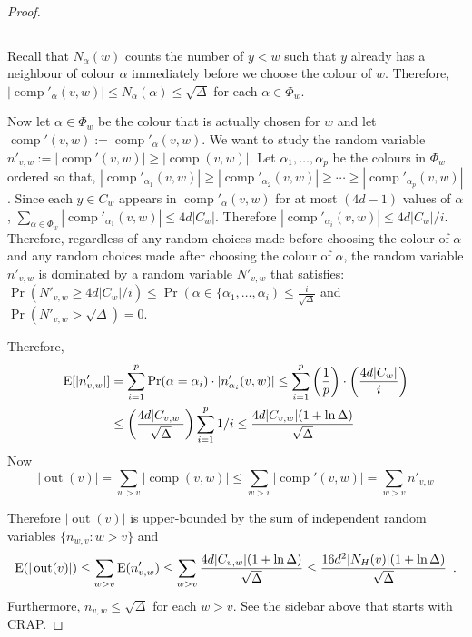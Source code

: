 \documentclass[kpfonts]{patmorin}
\DeclareMathOperator{\outn}{out}
\DeclareMathOperator{\comp}{comp}
\begin{document}
\begin{proof}
  \hrule






  Recall that $N_\alpha(w)$ counts the number of $y < w$ such that $y$ already has a neighbour of colour $\alpha$ immediately before we choose the colour of $w$.  Therefore,  $|\comp'_\alpha(v,w)|\le N_\alpha(\alpha)\le \sqrt{\Delta}$ for each $\alpha\in\Phi_w$.

  Now let $\alpha\in\Phi_w$ be the colour that is actually chosen for $w$ and let $\comp'(v,w):=\comp'_\alpha(v,w)$.  We want to study the random variable $n'_{v,w}:=|\comp'(v,w)|\ge |\comp(v,w)|$.  Let $\alpha_1,\ldots,\alpha_p$ be the colours in $\Phi_w$ ordered so that, $|\comp'_{\alpha_1}(v,w)|\ge|\comp'_{\alpha_2}(v,w)|\ge\cdots\ge |\comp'_{\alpha_p}(v,w)|$.  Since each $y\in C_w$ appears in
  $\comp'_{\alpha}(v,w)$ for at most $(4d-1)$ values of $\alpha$,  $\sum_{\alpha\in\Phi_w} |\comp'_{\alpha_1}(v,w)| \le 4d|C_w|$.  Therefore $|\comp'_{\alpha_i}(v,w)|\le 4d|C_w|/i$.    Therefore, regardless of any random choices made before choosing the colour of $\alpha$ and any random choices made after choosing the colour of $\alpha$, the random variable $n'_{v,w}$ is dominated by a random variable $N'_{v,w}$ that satisfies:
    $\Pr(N'_{v,w} \ge 4d|C_w|/i) \le \Pr(\alpha\in\{\alpha_1,\ldots,\alpha_i)\le \tfrac{i}{\sqrt{\Delta}}$
    and $\Pr(N'_{v,w}>\sqrt{\Delta})=0$.







  Therefore,
  \begin{align*}
    \mathrm{E}[|n'_{v,w}|]
    & = \sum_{i=1}^p \Pr(\alpha=\alpha_i)\cdot |n'_{\alpha_i}(v,w)|
    \le \sum_{i=1}^p \left(\frac{1}{p}\right)\cdot\left(\frac{4d|C_w|}{i}\right) \\
    & \le \left(\frac{4d|C_{v,w}|}{\sqrt{\Delta}}\right) \sum_{i=1}^p 1/i
    \le \frac{4d|C_{v,w}|(1+\ln \Delta)}{\sqrt{\Delta}}
  \end{align*}
  Now
  \[
     |\outn(v)| = \sum_{w>v}|\comp(v,w)|\le \sum_{w>v}|\comp'(v,w)|=\sum_{w>v} n'_{v,w}
  \]



  Therefore $|\outn(v)|$ is upper-bounded by the sum of independent random variables $\{n_{w,v}:w>v\}$ and
  \[
     \E(|\outn(v)|) \le \sum_{w>v} \E(n'_{v,w})
     \le \sum_{w>v}\frac{4d|C_{v,w}|(1+\ln\Delta)}{\sqrt{\Delta}}
     \le \frac{16d^2|N_{H}(v)|(1+\ln\Delta)}{\sqrt{\Delta}} \enspace .
  \]
  Furthermore, $n_{v,w}\le\sqrt{\Delta}$ for each $w>v$.  See the sidebar above that starts with CRAP.




\end{proof}
\end{document}
